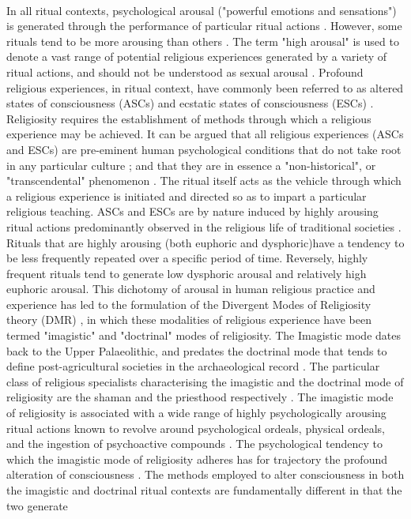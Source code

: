 \documentclass[12pt]{report}
\begin{document}
	\\
	In all ritual contexts, psychological arousal ("powerful emotions and sensations")\cite{whitehouse1992} is generated through the performance of particular ritual actions \cite{whitehouse2002}. However, some rituals tend to be more arousing than others \cite{whitehouse2004modes}. The term "high arousal" is used to denote a vast range of potential religious experiences generated by a variety of ritual actions, and should not be understood as sexual arousal \cite{whitehouse2004modes}. Profound religious experiences, in ritual context, have commonly been referred to as altered states of consciousness (ASCs) and ecstatic states of consciousness (ESCs) \cite{eliade1959sacred}\cite{eliade2024shamanism}\cite{price-williams1994}\cite{locke1985}\cite{wissler1922}\cite{lewis2003}. Religiosity requires the establishment of methods through which a religious experience may be achieved. It can be argued that all religious experiences (ASCs and ESCs) are pre-eminent human psychological conditions that do not take root in any particular culture ; and that they are in essence a "non-historical", or "transcendental" phenomenon \cite{price-williams1994}\cite{eliade1959sacred}\cite{bloch2008}\cite{griffiths2006}\cite{ludwig1966}. The ritual itself acts as the vehicle through which a religious experience is initiated and directed so as to impart a particular religious teaching. ASCs and ESCs are by nature induced by highly arousing ritual actions predominantly observed in the religious life of traditional societies \cite{hirschfeld1994}. Rituals that are highly arousing (both euphoric and dysphoric)have a tendency to be less frequently repeated over a specific period of time. Reversely, highly frequent rituals tend to generate low dysphoric arousal and relatively high euphoric arousal. This dichotomy of arousal  in human religious practice and experience has led to the formulation of the Divergent Modes of Religiosity theory (DMR) \cite{whitehouse2004modes}\cite{whitehouse2014}\cite{whitehouse2012}, in which these modalities of religious experience have been termed "imagistic" and "doctrinal" modes of religiosity. The Imagistic mode dates back to the Upper Palaeolithic, and predates the doctrinal mode that tends to define post-agricultural societies in the archaeological record \cite{mithen2004}\cite{johne.pfeiffer1984}\cite{whitehouse2004modes}. The particular class of religious specialists characterising the imagistic and the doctrinal mode of religiosity are the shaman and the priesthood respectively \cite{whitehouse2004modes}\cite{klein2002}\cite{lewis2003}. The imagistic mode of religiosity is associated with a wide range of highly psychologically arousing ritual actions known to revolve around psychological ordeals, physical ordeals, and the ingestion of psychoactive compounds \cite{price-williams1994}\cite{whitehouse2002}\cite{derios1974}\cite{havens1964}\cite{lewis2003}\cite{merlin2003}. The psychological tendency to which the imagistic mode of religiosity adheres has for trajectory the profound alteration of consciousness \cite{whitehouse2004modes}\cite{whitehouse2012}. The methods employed to alter consciousness in both the imagistic and doctrinal ritual contexts are fundamentally different in that the two generate 
\end{document}
